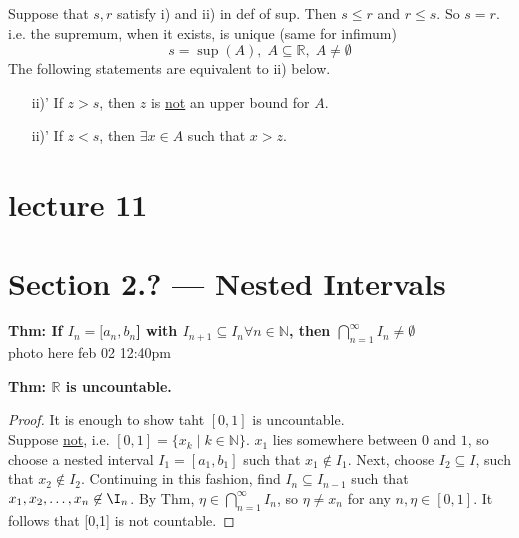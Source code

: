 \documentclass{report}
\newcommand{\N}{\mathbb{N}}  %
\newcommand{\R}{\mathbb{R}}  %
\theoremstyle{mystyle}
\theoremstyle{customtheorem}
\begin{document}
    Suppose that $s,r$ satisfy i) and ii) in def of sup. Then $s \leq r$ and $r \leq s$. So $s=r$.\\
    i.e. the supremum, when it exists, is unique (same for infimum)
    \[s=\sup(A), \;A \subseteq \R,\; A \neq \emptyset \]
    The following statements are equivalent to ii) below. \vspace{-1em} \begin{enumerate}
        \item[ii)'] If $z>s$, then $z$ is \ul{not} an upper bound for $A$.
        \item[ii)'] If $z < s$, then $\exists x \in A$ such that $x>z$.
    \end{enumerate}

    \pagebreak

    \section*{lecture 11}
    \section*{Section 2.? --- Nested Intervals}
    \textbf{Thm: If $I_n=[a_n,b_n$] with $I_{n+1}\subseteq I_n \forall n \in \N$, then $\bigcap_{n=1}^{\infty} I_n \neq \emptyset$} \\
    photo here feb 02 12:40pm


    \textbf{Thm: $\R$ is uncountable.}
    \begin{proof}
        It is enough to show taht $[0,1]$ is uncountable.\\
        Suppose \ul{not}, i.e. $[0,1]=\{x_k \mid k \in \N\}$. $x_1$ lies somewhere between $0$ and $1$, so choose a nested interval $I_1=[a_1,b_1]$ such that $x_1 \not \in I_1$. Next, choose $I_2 \subseteq I$, such that $x_2 \not \in I_2$. Continuing in this fashion, find $I_n\subseteq I_{n-1}$ such that $x_1, x_2, \ldots, x_n\not\in\I_n$. By Thm, $\eta \in \bigcap_{n=1}^\infty I_n$, so $\eta \neq x_n$ for any $n, \eta\in [0,1]$. It follows that [0,1] is not countable.
    \end{proof}
\end{document}
